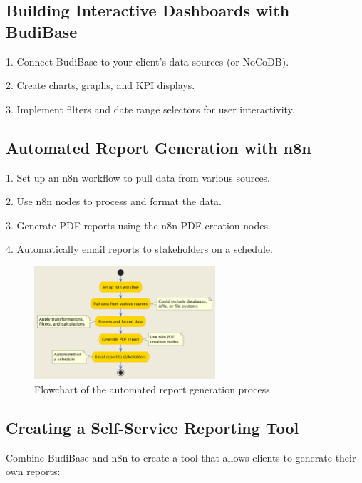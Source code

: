 \subsection{Building Interactive Dashboards with BudiBase}

1. Connect BudiBase to your client's data sources (or NoCoDB).

2. Create charts, graphs, and KPI displays.


3. Implement filters and date range selectors for user interactivity.


\subsection{Automated Report Generation with n8n}

1. Set up an n8n workflow to pull data from various sources.

2. Use n8n nodes to process and format the data.

3. Generate PDF reports using the n8n PDF creation nodes.

4. Automatically email reports to stakeholders on a schedule.

\begin{figure}
    \centering
    \includegraphics[width=0.6\textwidth]{./figures/automated_report_generation_flowchart.png}
    \caption{Flowchart of the automated report generation process}
    \label{fig:automated-report-generation}
\end{figure}

\subsection{Creating a Self-Service Reporting Tool}

Combine BudiBase and n8n to create a tool that allows clients to generate their own reports:

